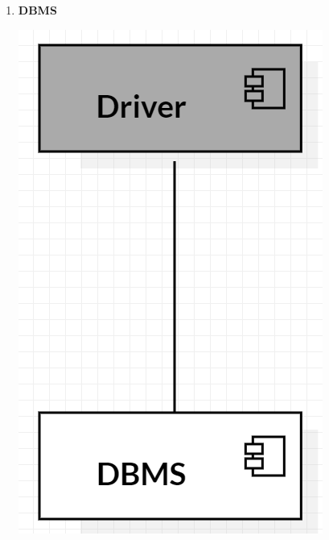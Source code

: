 \documentclass[a4paper]{report}
\begin{document}
\begin{enumerate}
    \item \textbf{DBMS}\par
    \begin{minipage}{\linewidth}
        \centering
        \includegraphics[scale=0.3]{img/INTEGRATION_1.png}
    \end{minipage}


\end{enumerate}
\end{document}
